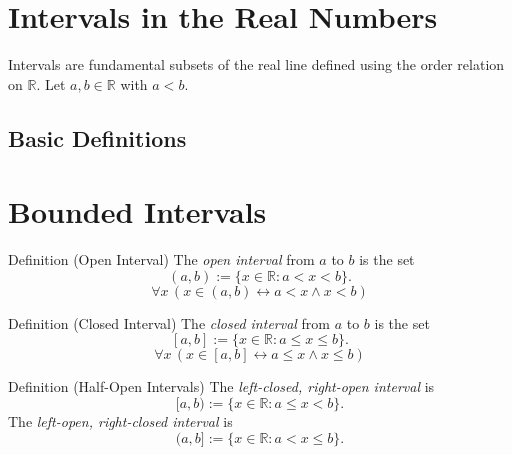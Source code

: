 
\section{Intervals in the Real Numbers}

\begin{exposition}
Intervals are fundamental subsets of the real line defined using the order
relation on $\mathbb{R}$. Let $a,b \in \mathbb{R}$ with $a < b$.
\end{exposition}

\subsection*{Basic Definitions}

\section*{Bounded Intervals}

\begin{definitionbox}{Definition (Open Interval)}
The \emph{open interval} from $a$ to $b$ is the set
\[
(a,b) := \{ x \in \mathbb{R} : a < x < b \}.
\]
\[
\forall x \, (x \in (a,b) \leftrightarrow a < x \wedge x < b)
\]
\end{definitionbox}
\label{def:open-interval-R}

\begin{definitionbox}{Definition (Closed Interval)}
The \emph{closed interval} from $a$ to $b$ is the set
\[
[a,b] := \{ x \in \mathbb{R} : a \le x \le b \}.
\]
\[
\forall x \, (x \in [a,b] \leftrightarrow a \le x \wedge x \le b)
\]
\end{definitionbox}
\label{def:closed-interval-R}

\begin{definitionbox}{Definition (Half-Open Intervals)}
The \emph{left-closed, right-open interval} is
\[
[a,b) := \{ x \in \mathbb{R} : a \le x < b \}.
\]
The \emph{left-open, right-closed interval} is
\[
(a,b] := \{ x \in \mathbb{R} : a < x \le b \}.
\]
\end{definitionbox}

